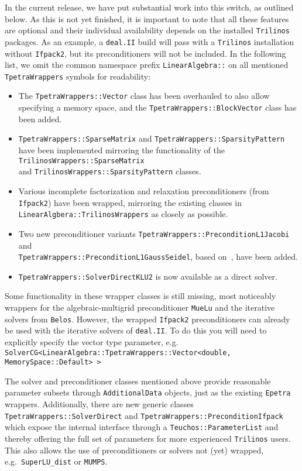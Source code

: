 \documentclass{ansarticle-preprint}
\newcommand{\specialword}[1]{\texttt{#1}}
\newcommand{\dealii}{{\specialword{deal.II}}\xspace}
\newcommand{\trilinos}{{\specialword{Trilinos}}\xspace}
\begin{document}
In the current release, we have put substantial work into this switch,
as outlined below. As this is not yet finished, it is important to note that 
all these features are optional and their individual availability
depends on the installed \trilinos{} packages. 
As an example, a \dealii{} build will pass with a \trilinos{} installation 
without \texttt{Ifpack2}, but its preconditioners will not be included.
In the following list, we omit the common namespace prefix
\texttt{LinearAlgebra::} on all mentioned
\texttt{TpetraWrappers} symbols for readability:
\begin{itemize}
  \item The \texttt{TpetraWrappers::Vector} class has been overhauled to also allow specifying
    a memory space, and the \texttt{TpetraWrappers::BlockVector} class has been added.
  \item \texttt{TpetraWrappers::SparseMatrix} and \texttt{TpetraWrappers::SparsityPattern} have been implemented mirroring
    the functionality of the \texttt{TrilinosWrappers::SparseMatrix} \\ and \texttt{TrilinosWrappers::SparsityPattern} classes.
  \item Various incomplete factorization and relaxation preconditioners (from \texttt{Ifpack2}) have been wrapped,
    mirroring the existing classes in \texttt{LinearAlgbera::TrilinosWrappers} as closely as possible.
  \item Two new preconditioner variants \texttt{TpetraWrappers::PreconditionL1Jacobi} and \\
    \texttt{TpetraWrappers::PreconditionL1GaussSeidel}, based on~\cite{BFKY2011}, have been added.
  \item \texttt{TpetraWrappers::SolverDirectKLU2} is now available as a direct solver.
\end{itemize}
Some functionality in these wrapper classes is still missing, 
most noticeably wrappers for the algebraic-multigrid preconditioner \texttt{MueLu}
and the iterative solvers from \texttt{Belos}.
However, the wrapped \texttt{Ifpack2} preconditioners can already be used with the iterative solvers of \dealii{}.
To do this you will need to explicitly specify the vector type parameter,
e.g.\\ \texttt{SolverCG<LinearAlgebra::TpetraWrappers::Vector<double, MemorySpace::Default> >}

The solver and preconditioner classes mentioned above provide reasonable parameter subsets 
through \texttt{AdditionalData} objects, just as the existing
\texttt{Epetra} wrappers. 
Additionally, there are new generic classes \texttt{TpetraWrappers::SolverDirect} 
and \texttt{TpetraWrappers::PreconditionIfpack} which expose the internal interface through
a \texttt{Teuchos::ParameterList} and thereby offering the full set of parameters for 
more experienced \trilinos{} users. This also allows the use of preconditioners or 
solvers not (yet) wrapped, e.g.\ \texttt{SuperLU\_dist} or \texttt{MUMPS}.
\end{document}
